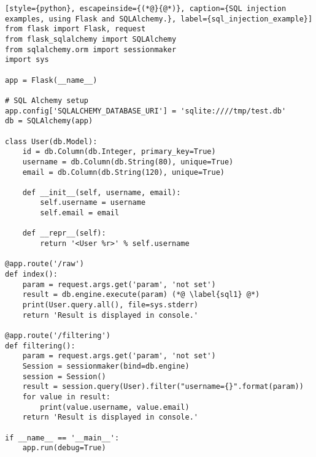 \begin{lstlisting}[style={python}, escapeinside={(*@}{@*)}, caption={SQL injection examples, using Flask and SQLAlchemy.}, label={sql_injection_example}]
from flask import Flask, request
from flask_sqlalchemy import SQLAlchemy
from sqlalchemy.orm import sessionmaker
import sys

app = Flask(__name__)

# SQL Alchemy setup
app.config['SQLALCHEMY_DATABASE_URI'] = 'sqlite:////tmp/test.db'
db = SQLAlchemy(app)

class User(db.Model):
    id = db.Column(db.Integer, primary_key=True)
    username = db.Column(db.String(80), unique=True)
    email = db.Column(db.String(120), unique=True)

    def __init__(self, username, email):
        self.username = username
        self.email = email

    def __repr__(self):
        return '<User %r>' % self.username    
    
@app.route('/raw')
def index():
    param = request.args.get('param', 'not set')
    result = db.engine.execute(param) (*@ \label{sql1} @*)
    print(User.query.all(), file=sys.stderr)
    return 'Result is displayed in console.'

@app.route('/filtering')
def filtering():
    param = request.args.get('param', 'not set')
    Session = sessionmaker(bind=db.engine)
    session = Session()
    result = session.query(User).filter("username={}".format(param))
    for value in result:
        print(value.username, value.email)
    return 'Result is displayed in console.'

if __name__ == '__main__':
    app.run(debug=True)
\end{lstlisting}
